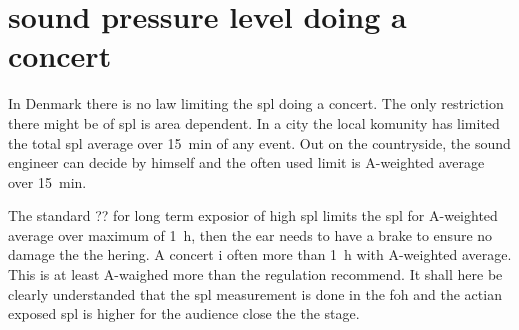 

\section{sound pressure level doing a concert}
In Denmark there is no law limiting the \gls{spl} doing a concert. The only restriction there might be of \gls{spl} is area dependent. In a city the local komunity has limited the total \gls{spl} average over \SI{15}{\minute} of any event. Out on the countryside, the sound engineer can decide by himself and the often used limit is A-weighted  average over \SI{15}{\minute}. 


The standard ?? for long term exposior of high \gls{spl} limits the \gls{spl} for A-weighted  average over maximum of \SI{1}{\hour}, then the ear needs to have a brake to ensure no damage the the hering. A concert i often more than \SI{1}{\hour} with A-weighted  average. This is at least  A-waighed more than the regulation recommend. It shall here be clearly understanded that the \gls{spl} measurement is done in the \gls{foh} and the actian exposed \gls{spl} is higher for the audience close the the stage.   




